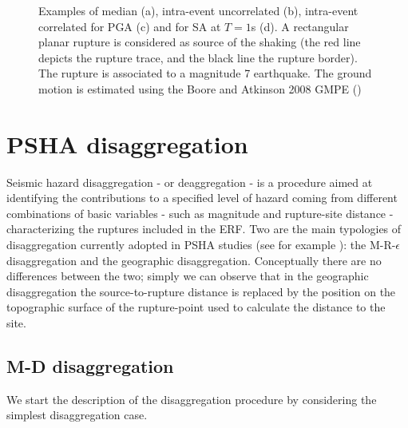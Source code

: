 \begin{figure}[htbp]
\begin{center}
\caption{Examples of median (a), intra-event uncorrelated (b), intra-event correlated for PGA (c) and for SA at $T=1$s (d). A rectangular planar rupture is considered as source of the shaking (the red line depicts the rupture trace, and the black line the rupture border). The rupture is associated to a magnitude 7 earthquake. The ground motion is estimated using the Boore and Atkinson 2008 GMPE (\cite{boore2008})}
\label{gmfs}
\end{center}
\end{figure}
%
\clearpage\newpage
\section{PSHA disaggregation}
\label{chap:disaggregation}
%
Seismic hazard disaggregation - or deaggregation - \citep{mcguire1995,bazzurro1999} is a procedure aimed at identifying the contributions to a specified level of hazard coming from different combinations
of basic variables - such as magnitude and rupture-site distance - characterizing the ruptures included in the ERF.
%
Two are the main typologies of disaggregation currently adopted in PSHA studies (see for example \citet{petersen2008}): the M-R-$\epsilon$ disaggregation and the geographic disaggregation. Conceptually there are no differences between the two; simply we can observe that in the geographic disaggregation the source-to-rupture distance is replaced by the position on the topographic surface of the rupture-point used to calculate the distance to the site.
%

\subsection{M-D disaggregation}
We start the description of the disaggregation procedure by considering the  simplest disaggregation case. 

